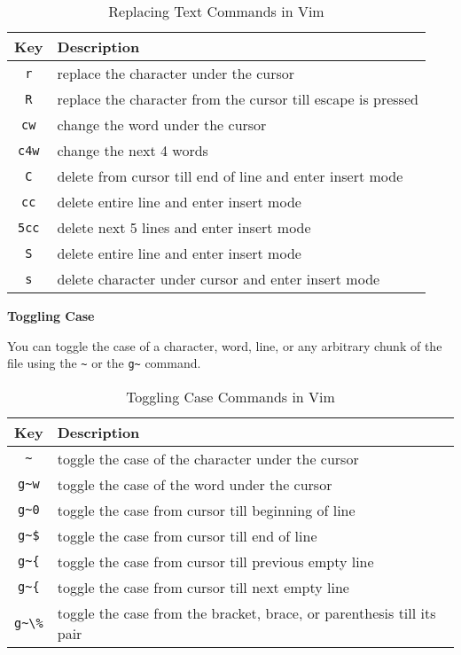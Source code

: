 \begin{table*}[h!]
  \caption{Replacing Text Commands in Vim}
  \begin{tabular}{c l}
    \toprule
    Key & Description \\
    \midrule
    \lstinline|r| & replace the character under the cursor \\
    \lstinline|R| & replace the character from the cursor till escape is pressed \\
    \lstinline|cw| & change the word under the cursor \\
    \lstinline|c4w| & change the next 4 words \\
    \lstinline|C| & delete from cursor till end of line and enter insert mode \\
    \lstinline|cc| & delete entire line and enter insert mode \\
    \lstinline|5cc| & delete next 5 lines and enter insert mode \\
    \lstinline|S| & delete entire line and enter insert mode \\
    \lstinline|s| & delete character under cursor and enter insert mode \\
    \bottomrule
  \end{tabular}
\end{table*}

\textbf{Toggling Case}

You can toggle the case of a character, word, line,
or any arbitrary chunk of the file using the \lstinline|~|
or the \lstinline|g~| command.

\begin{table*}[h!]
  \caption{Toggling Case Commands in Vim}
  \begin{tabular}{c l}
    \toprule
    Key & Description \\
    \midrule
    \lstinline|~| & toggle the case of the character under the cursor \\
    \lstinline|g~w| & toggle the case of the word under the cursor \\
    \lstinline|g~0| & toggle the case from cursor till beginning of line \\
    \lstinline|g~$| & toggle the case from cursor till end of line \\
    \lstinline|g~{| & toggle the case from cursor till previous empty line \\
    \lstinline|g~{| & toggle the case from cursor till next empty line \\
    \lstinline|g~\%| & toggle the case from the bracket, brace, or parenthesis till its pair \\
    \bottomrule
  \end{tabular}
\end{table*}

